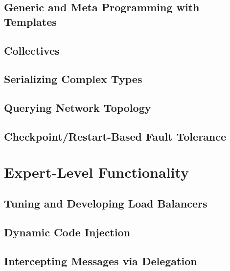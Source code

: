 \documentclass[10pt]{report}
\begin{document}
\chapter{Generic and Meta Programming with Templates}
\label{templates}
  

\chapter{Collectives}
  

\chapter{Serializing Complex Types}
  

\chapter{Querying Network Topology}
\label{topo}
  

\chapter{Checkpoint/Restart-Based Fault Tolerance}
\label{sec:checkpoint}
  



\part{Expert-Level Functionality}

\chapter{Tuning and Developing Load Balancers}
\label{advancedlb}
  

\chapter{Dynamic Code Injection}
\label{python}
  

\chapter{Intercepting Messages via Delegation}
\label{delegation}
  
\end{document}
